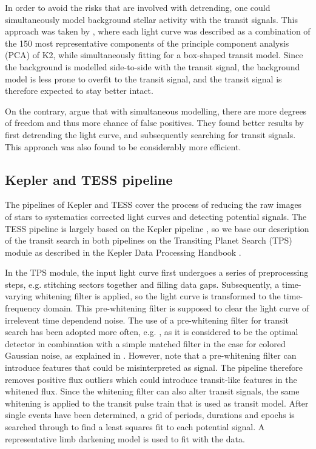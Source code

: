In order to avoid the risks that are involved with detrending, one could simultaneously model background stellar activity with the transit signals. This approach was taken by \cite{foreman2015systematic}, where each light curve was described as a combination of the 150 most representative components of the principle component analysis (PCA) of K2, while simultaneously fitting for a box-shaped transit model. Since the background is modelled side-to-side with the transit signal, the background model is less prone to overfit to the transit signal, and the transit signal is therefore expected to stay better intact.

On the contrary, \cite{kovacs2016periodic} argue that with simultaneous modelling, there are more degrees of freedom and thus more chance of false positives. They found better results by first detrending the light curve, and subsequently searching for transit signals. This approach was also found to be considerably more efficient.

\subsection{Kepler and TESS pipeline}

The pipelines of Kepler and TESS cover the process of reducing the raw images of stars to systematics corrected light curves and detecting potential signals. The TESS pipeline is largely based on the Kepler pipeline \citep{jenkins2016tess}, so we base our description of the transit search in both pipelines on the Transiting Planet Search (TPS) module as described in the Kepler Data Processing Handbook \cite{jenkins2017kepler}. 

In the TPS module, the input light curve first undergoes a series of preprocessing steps, e.g. stitching sectors together and filling data gaps. Subsequently, a time-varying whitening filter is applied, so the light curve is transformed to the time-frequency domain. This pre-whitening filter is supposed to clear the light curve of irrelevent time dependend noise. The use of a pre-whitening filter for transit search has been adopted more often, e.g. \cite{carpano2003detecting}, as it is considered to be the optimal detector in combination with a simple matched filter in the case for colored Gaussian noise, as explained in \cite{jenkins2002impact}. However, \cite{rodenbeck2018revisiting} note that a pre-whitening filter can introduce features that could be misinterpreted as signal. The pipeline therefore removes positive flux outliers which could introduce transit-like features in the whitened flux. Since the whitening filter can also alter transit signals, the same whitening is applied to the transit pulse train that is used as transit model. After single events have been determined, a grid of periods, durations and epochs is searched through to find a least squares fit to each potential signal. A representative limb darkening model is used to fit with the data.

